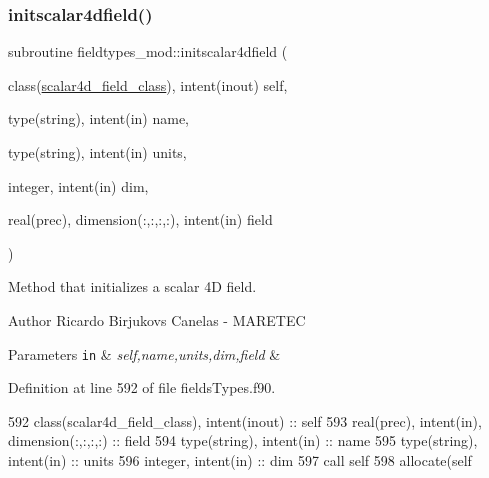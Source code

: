\subsubsection{\texorpdfstring{initscalar4dfield()}{initscalar4dfield()}}
{\footnotesize\ttfamily subroutine fieldtypes\+\_\+mod\+::initscalar4dfield (\begin{DoxyParamCaption}\item[{class(\mbox{\hyperlink{structfieldtypes__mod_1_1scalar4d__field__class}{scalar4d\+\_\+field\+\_\+class}}), intent(inout)}]{self,  }\item[{type(string), intent(in)}]{name,  }\item[{type(string), intent(in)}]{units,  }\item[{integer, intent(in)}]{dim,  }\item[{real(prec), dimension(\+:,\+:,\+:,\+:), intent(in)}]{field }\end{DoxyParamCaption})\hspace{0.3cm}{\ttfamily [private]}}



Method that initializes a scalar 4D field. 

\begin{DoxyAuthor}{Author}
Ricardo Birjukovs Canelas -\/ M\+A\+R\+E\+T\+EC 
\end{DoxyAuthor}

\begin{DoxyParams}[1]{Parameters}
\mbox{\tt in}  & {\em self,name,units,dim,field} & \\
\hline
\end{DoxyParams}


Definition at line 592 of file fields\+Types.\+f90.


\begin{DoxyCode}
592     \textcolor{keywordtype}{class}(scalar4d\_field\_class), \textcolor{keywordtype}{intent(inout)} :: self
593     \textcolor{keywordtype}{real(prec)}, \textcolor{keywordtype}{intent(in)}, \textcolor{keywordtype}{dimension(:,:,:,:)} :: field
594     \textcolor{keywordtype}{type}(string), \textcolor{keywordtype}{intent(in)} :: name
595     \textcolor{keywordtype}{type}(string), \textcolor{keywordtype}{intent(in)} :: units
596     \textcolor{keywordtype}{integer}, \textcolor{keywordtype}{intent(in)} :: dim
597     \textcolor{keyword}{call }self%
598     \textcolor{keyword}{allocate}(self%
\end{DoxyCode}
\mbox{\label{namespacefieldtypes__mod_ad1af664e23793260f9c2fcd03829a1f5}} 
